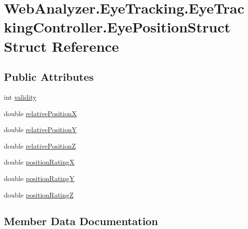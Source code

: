 \hypertarget{struct_web_analyzer_1_1_eye_tracking_1_1_eye_tracking_controller_1_1_eye_position_struct}{}\section{Web\+Analyzer.\+Eye\+Tracking.\+Eye\+Tracking\+Controller.\+Eye\+Position\+Struct Struct Reference}
\label{struct_web_analyzer_1_1_eye_tracking_1_1_eye_tracking_controller_1_1_eye_position_struct}
\subsection*{Public Attributes}
\begin{DoxyCompactItemize}
\item 
int \hyperlink{struct_web_analyzer_1_1_eye_tracking_1_1_eye_tracking_controller_1_1_eye_position_struct_aac8d81bc2c121face2cf0ef08bdb4199}{validity}
\item 
double \hyperlink{struct_web_analyzer_1_1_eye_tracking_1_1_eye_tracking_controller_1_1_eye_position_struct_aaf27cd23c043e768a3aa7bb8bf72c8b3}{relative\+Position\+X}
\item 
double \hyperlink{struct_web_analyzer_1_1_eye_tracking_1_1_eye_tracking_controller_1_1_eye_position_struct_ae919d2dd843b284a313d261fcecdc758}{relative\+Position\+Y}
\item 
double \hyperlink{struct_web_analyzer_1_1_eye_tracking_1_1_eye_tracking_controller_1_1_eye_position_struct_a01fe5b8c9ea88c75d05fb4f2b552e7fc}{relative\+Position\+Z}
\item 
double \hyperlink{struct_web_analyzer_1_1_eye_tracking_1_1_eye_tracking_controller_1_1_eye_position_struct_a22c043cee1f00fac33afcd231361e36e}{position\+Rating\+X}
\item 
double \hyperlink{struct_web_analyzer_1_1_eye_tracking_1_1_eye_tracking_controller_1_1_eye_position_struct_a121662257db3bdfa9a7dbe5de4b9c441}{position\+Rating\+Y}
\item 
double \hyperlink{struct_web_analyzer_1_1_eye_tracking_1_1_eye_tracking_controller_1_1_eye_position_struct_aeb60ca92ef82ef321db43d0b9cf1bf3e}{position\+Rating\+Z}
\end{DoxyCompactItemize}


\subsection{Member Data Documentation}
\hypertarget{struct_web_analyzer_1_1_eye_tracking_1_1_eye_tracking_controller_1_1_eye_position_struct_a22c043cee1f00fac33afcd231361e36e}{}
